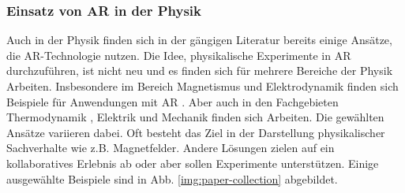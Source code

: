 \subsubsection{Einsatz von AR in der Physik}
\label{sec-2-2-2}
Auch in der Physik finden sich in der gängigen Literatur bereits einige Ansätze, die AR-Technologie nutzen. Die Idee, physikalische Experimente in AR durchzuführen, ist nicht neu und es finden sich für mehrere Bereiche der Physik Arbeiten. Insbesondere im Bereich Magnetismus und Elektrodynamik finden sich Beispiele für Anwendungen mit AR \cite{Ibanez14, Matsutomo13, Mannuss11, Buchau09}. Aber auch in den Fachgebieten Thermodynamik \cite{Strzys17, Strzys18}, Elektrik \cite{Akcayir16, Amiraslanov18, Javaheri18} und Mechanik \cite{Li11, Jerry10, Kaufmann08} finden sich Arbeiten. Die gewählten Ansätze variieren dabei. Oft besteht das Ziel in der Darstellung physikalischer Sachverhalte wie z.B. Magnetfelder. Andere Lösungen zielen auf ein kollaboratives Erlebnis ab oder aber sollen Experimente unterstützen. Einige ausgewählte Beispiele sind in Abb. \ref{img:paper-collection} abgebildet. 

